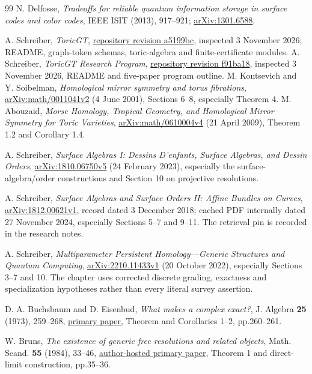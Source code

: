 \documentclass[11pt,oneside,openany]{book}
\theoremstyle{definition}\newtheorem{definition}[theorem]{Definition}
\theoremstyle{remark}\newtheorem{remark}[theorem]{Remark}
\begin{document}
\begin{thebibliography}{99}
N. Delfosse, \emph{Tradeoffs for reliable quantum information storage in
surface codes and color codes}, IEEE ISIT (2013), 917--921;
\href{https://arxiv.org/abs/1301.6588}{arXiv:1301.6588}.

 A. Schreiber, \emph{ToricGT},
\href{https://github.com/amelie-iska/ToricGT/tree/a5199bc989a6fb170e21220e5e87bf95bc2fc0b4}{repository revision a5199bc},
inspected 3 November 2026; README, graph-token schemas, toric-algebra and finite-certificate modules.
 A. Schreiber, \emph{ToricGT Research Program},
\href{https://github.com/amelie-iska/ToricGT-Program/tree/f91ba1811b5a4f70d53c7120acf8ca2a0049f85b}{repository revision f91ba18},
inspected 3 November 2026, README and five-paper program outline.
 M. Kontsevich and Y. Soibelman,
\emph{Homological mirror symmetry and torus fibrations},
\href{https://arxiv.org/abs/math/0011041v2}{arXiv:math/0011041v2} (4 June 2001),
Sections 6--8, especially Theorem 4.
 M. Abouzaid,
\emph{Morse Homology, Tropical Geometry, and Homological Mirror Symmetry for Toric Varieties},
\href{https://arxiv.org/abs/math/0610004v4}{arXiv:math/0610004v4} (21 April 2009),
Theorem 1.2 and Corollary 1.4.

 A. Schreiber,
\emph{Surface Algebras I: Dessins D'enfants, Surface Algebras, and Dessin Orders},
\href{https://arxiv.org/abs/1810.06750v5}{arXiv:1810.06750v5} (24 February 2023),
especially the surface-algebra/order constructions and Section 10 on projective resolutions.

 A. Schreiber,
\emph{Surface Algebras and Surface Orders II: Affine Bundles on Curves},
\href{https://arxiv.org/abs/1812.00621v1}{arXiv:1812.00621v1},
record dated 3 December 2018; cached PDF internally dated 27 November 2024,
especially Sections 5--7 and 9--11. The retrieval pin is recorded in the research notes.

 A. Schreiber,
\emph{Multiparameter Persistent Homology---Generic Structures and Quantum Computing},
\href{https://arxiv.org/abs/2210.11433v1}{arXiv:2210.11433v1} (20 October 2022),
especially Sections 3--7 and 10. The chapter uses corrected discrete grading,
exactness and specialization hypotheses rather than every literal survey assertion.

 D. A. Buchsbaum and D. Eisenbud,
\emph{What makes a complex exact?}, J. Algebra \textbf{25} (1973), 259--268,
\href{https://eisenbud.github.io/papers/pdfs/1973-002.pdf}{primary paper},
Theorem and Corollaries 1--2, pp.260--261.

 W. Bruns,
\emph{The existence of generic free resolutions and related objects},
Math. Scand. \textbf{55} (1984), 33--46,
\href{https://www.home.uni-osnabrueck.de/wbruns/brunsw/pdf-article/GenFreeRes.pdf}{author-hosted primary paper},
Theorem 1 and direct-limit construction, pp.35--36.

\end{thebibliography}
\end{document}
